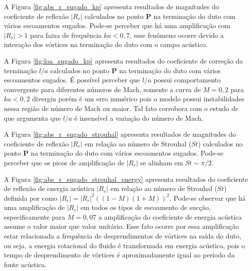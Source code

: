 A Figura \ref{fig:abs_r_sugado_kp} apresenta resultados de magnitudes do coeficiente de reflexão $|R_{r}|$ calculados no ponto $\textbf{P}$ na terminação do duto com vários escoamentos sugados. Pode-se perceber que há uma amplificação com $|R_{r}| > 1$ para faixa de frequência $ka < 0,7$, esse fenômeno ocorre devido a interação dos vórtices na terminação do duto com o campo acústico.

A Figura \ref{fig:loa_sugado_kp} apresenta resultados do coeficiente de correção da terminação $l/a$ calculados no ponto $\textbf{P}$ na terminação do duto com vários escoamentos sugados. É possível perceber que $l/a$ possui comportamento convergente para diferentes números de Mach, somente a curva de $M = 0,2$ para $ka < 0,2$ divergiu porém é um erro numérico pois o modelo possui instabilidades nessa região de número de Mach ou maior. Tal fato corrobora com o estudo de  que argumenta que $l/a$ é insensível a variação do número de Mach.  

\newpage
\begin{figure}[ht!]
  \centering
  
\end{figure}

\begin{figure}[ht!]
\centering
  
\end{figure}

 A Figura \ref{fig:abs_r_sugado_strouhal} apresenta resultados de magnitudes do coeficiente de reflexão $|R_{r}|$ em relação ao número de Strouhal ($St$) calculados no ponto $\textbf{P}$ na terminação do duto com vários escoamentos sugados. Pode-se perceber que os picos de amplificação de $|R_{r}|$ se alinham em $St \sim \pi/2$.

A Figura \ref{fig:abs_r_sugado_strouhal_energy} apresenta resultados do coeficiente de reflexão de energia acústica $|R_{e}|$ em relação ao número de Strouhal ($St$) definida por  como $|R_{e}| = |R_{r}|^{2}((1 - M)(1 + M))^{2}$. Pode-se observar que há uma amplificação de $|R_{e}|$ em todos os tipos de escoamento de sucção, especificamente para $M = 0,07$ a amplificação do coeficiente de energia acústica assume o valor maior que valor unitário. Esse fato ocorre por essa amplificação estar relacionada a frequência de desprendimentos de vórtices na saída do duto, ou seja, a energia rotacional do fluido é transformada em energia acústica, pois o tempo de desprendimento de vórtices é aproximadamente igual ao período da fonte acústica. 

